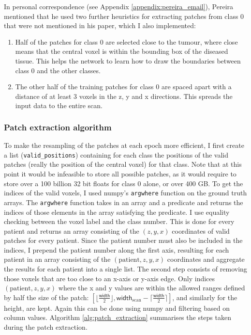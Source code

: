 \documentclass[12pt,a4paper,twoside,openright]{report}
\begin{document}
In personal correspondence (see Appendix \ref{appendix:pereira_email}), Pereira mentioned that he used two further heuristics for extracting patches from class 0 that were not mentioned in his paper, which I also implemented:
\begin{enumerate}
	\item Half of the patches for class 0 are selected close to the tumour, where close means that the central voxel is within the bounding box of the diseased tissue. This helps the network to learn how to draw the boundaries between class 0 and the other classes.
	\item The other half of the training patches for class 0 are spaced apart with a distance of at least 3 voxels in the z, y and x directions. This spreads the input data to the entire scan.
\end{enumerate}


\subsubsection{Patch extraction algorithm}
To make the resampling of the patches at each epoch more efficient, I first create a list (\texttt{valid\_positions}) containing for each class the positions of the valid patches (really the position of the central voxel) for that class. Note that at this point it would be infeasible to store all possible patches, as it would require to store over a 100 billion 32 bit floats for class 0 alone, or over 400 GB. To get the indices of the valid voxels, I used numpy's \texttt{argwhere} function on the ground truth arrays. The \texttt{argwhere} function takes in an array and a predicate and returns the indices of those elements in the array satisfying the predicate. I use equality checking between the voxel label and the class number. This is done for every patient and returns an array consisting of the $(z, y, x)$ coordinates of valid patches for every patient. Since the patient number must also be included in the indices, I prepend the patient number along the first axis, resulting for each patient in an array consisting of the $(\text{patient}, z, y, x)$ coordinates and aggregate the results for each patient into a single list. The second step consists of removing those voxels that are too close to an x-axis or y-axis edge. Only indices $(\text{patient}, z, y, x)$ where the x and y values are  within the allowed ranges defined by half the size of the patch: $[\lfloor \frac{\textsf{width}}{2} \rfloor, \textsf{width}_{\text{scan}} - \lceil \frac{\textsf{width}}{2} \rceil]$, and similarly for the height, are kept. Again this can be done using numpy and filtering based on column values. Algorithm \ref{alg:patch_extraction} summarises the steps taken during the patch extraction. 
\end{document}
